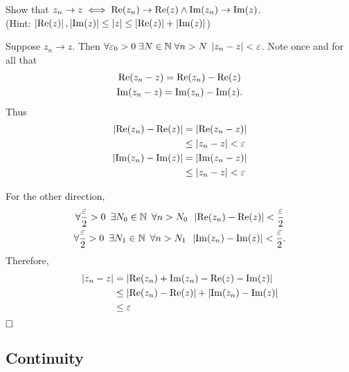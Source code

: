 \documentclass[notoc,notitlepage]{tufte-book}
\begin{document}
\begin{ex}\label{ex:convergence in complex iff convergence of real and imaginary parts in real}
	Show that $z_n \to z \iff \operatorname{Re}(z_n) \to \operatorname{Re}(z) \land \operatorname{Im}(z_n) \to \operatorname{Im}(z)$. \\
	(Hint: $\left|\operatorname{Re}(z)\right|, \left|\operatorname{Im}(z)\right| \leq \left|z\right| \leq \left|\operatorname{Re}(z)\right| + \left|\operatorname{Im}(z)\right|$)

	\begin{solution}
		Suppose $z_n \to z$. Then $\forall \varepsilon_0 > 0 \; \exists N \in \mathbb{N} \; \forall n > N \; \left|z_n - z\right| < \varepsilon$. Note once and for all that
		\begin{gather*}
			\operatorname{Re}(z_n - z) = \operatorname{Re}(z_n) - \operatorname{Re}(z) \\
			\operatorname{Im}(z_n - z) = \operatorname{Im}(z_n) - \operatorname{Im}(z).
		\end{gather*}
		Thus
		\begin{align*}
			\left|\operatorname{Re}(z_n) - \operatorname{Re}(z)\right| &= \left|\operatorname{Re}(z_n - z)\right| \\
					&\leq \left|z_n - z\right| < \varepsilon \\
			\left|\operatorname{Im}(z_n) - \operatorname{Im}(z)\right| &= \left|\operatorname{Im}(z_n - z)\right| \\
					&\leq \left|z_n - z\right| < \varepsilon
		\end{align*}

		For the other direction,
		\begin{gather*}
			\forall \frac{\varepsilon}{2} > 0 \enspace \exists N_0 \in \mathbb{N} \enspace \forall n > N_0 \enspace \left|\operatorname{Re}(z_n) - \operatorname{Re}(z)\right| < \frac{\varepsilon}{2} \\
			\forall \frac{\varepsilon}{2} > 0 \enspace \exists N_1 \in \mathbb{N} \enspace \forall n > N_1 \enspace \left|\operatorname{Im}(z_n) - \operatorname{Im}(z)\right| < \frac{\varepsilon}{2}.
		\end{gather*}
		Therefore,
		\begin{align*}
			\left|z_n - z\right| &= \left|\operatorname{Re}(z_n) + \operatorname{Im}(z_n) - \operatorname{Re}(z) - \operatorname{Im}(z)\right| \\
				&\leq \left|\operatorname{Re}(z_n) - \operatorname{Re}(z)\right| + \left|\operatorname{Im}(z_n) - \operatorname{Im}(z)\right| \\
				&\leq \varepsilon
		\end{align*}
		$\qed$
	\end{solution}
\end{ex}


\subsection{Continuity} %
\label{sub:continuity}
\end{document}
